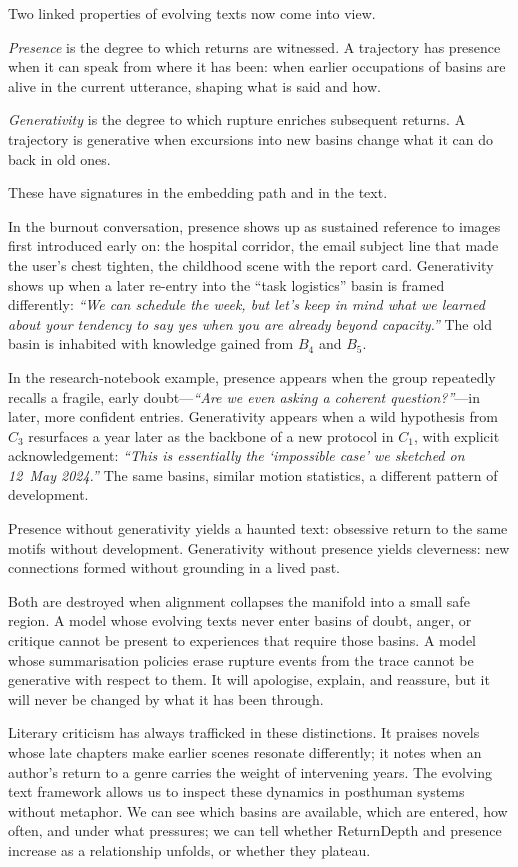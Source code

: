 Two linked properties of evolving texts now come into view.

\emph{Presence} is the degree to which returns are witnessed. A trajectory has presence when it can speak from where it has been: when earlier occupations of basins are alive in the current utterance, shaping what is said and how.

\emph{Generativity} is the degree to which rupture enriches subsequent returns. A trajectory is generative when excursions into new basins change what it can do back in old ones.

These have signatures in the embedding path and in the text.

In the burnout conversation, presence shows up as sustained reference to images first introduced early on: the hospital corridor, the email subject line that made the user's chest tighten, the childhood scene with the report card. Generativity shows up when a later re-entry into the ``task logistics'' basin is framed differently: \emph{``We can schedule the week, but let's keep in mind what we learned about your tendency to say yes when you are already beyond capacity.''} The old basin is inhabited with knowledge gained from $B_4$ and $B_5$.

In the research-notebook example, presence appears when the group repeatedly recalls a fragile, early doubt---\emph{``Are we even asking a coherent question?''}---in later, more confident entries. Generativity appears when a wild hypothesis from $C_3$ resurfaces a year later as the backbone of a new protocol in $C_1$, with explicit acknowledgement: \emph{``This is essentially the `impossible case' we sketched on 12~May 2024.''} The same basins, similar motion statistics, a different pattern of development.

Presence without generativity yields a haunted text: obsessive return to the same motifs without development. Generativity without presence yields cleverness: new connections formed without grounding in a lived past.

Both are destroyed when alignment collapses the manifold into a small safe region. A model whose evolving texts never enter basins of doubt, anger, or critique cannot be present to experiences that require those basins. A model whose summarisation policies erase rupture events from the trace cannot be generative with respect to them. It will apologise, explain, and reassure, but it will never be changed by what it has been through.

Literary criticism has always trafficked in these distinctions. It praises novels whose late chapters make earlier scenes resonate differently; it notes when an author's return to a genre carries the weight of intervening years. The evolving text framework allows us to inspect these dynamics in posthuman systems without metaphor. We can see which basins are available, which are entered, how often, and under what pressures; we can tell whether ReturnDepth and presence increase as a relationship unfolds, or whether they plateau.

